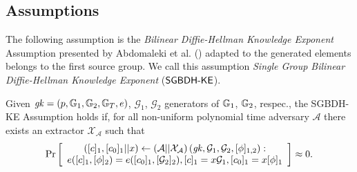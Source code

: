 \subsection{Assumptions}

The following assumption is the \emph{Bilinear Diffie-Hellman Knowledge Exponent} Assumption presented by Abdomaleki et al. (\cite{AC:ABLZ17}) adapted to the generated elements belongs to the first source group. We call this assumption \emph{Single Group Bilinear Diffie-Hellman Knowledge Exponent} ($\mathsf{SGBDH\mbox{-}KE}$).

\begin{assumption} Given $\mathit{gk}=(p,\mathbb{G}_1,\mathbb{G}_2,\mathbb{G}_T,e)$, $\mathcal{G}_1$, $\mathcal{G}_2$ generators of $\mathbb{G}_1$, $\mathbb{G}_2$, respec., the SGBDH-KE Assumption holds if, for all non-uniform polynomial time adversary $\mathcal{A}$ there exists an extractor $\mathcal{X}_{\mathcal{A}}$ such that
	$$\text{Pr}\left[
	\begin{array}{c}
	\left([c]_1,[c_0]_1||x\right)\gets \left(\mathcal{A}||\mathcal{X}_{\mathcal{A}}\right)\left(\mathit{gk},\mathcal{G}_1,\mathcal{G}_2,[\phi]_{1,2}\right):\\
	e([c]_1,[\phi]_2)=e([c_0]_1,[\mathcal{G}_2]_2), [c]_1=x \mathcal{G}_1, [c_0]_1=x [\phi]_1
	\end{array}\right] \approx 0.$$
\end{assumption}